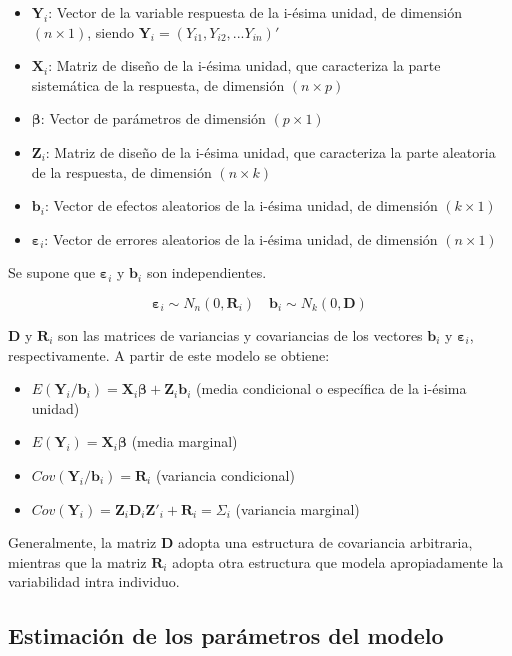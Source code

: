 \documentclass[spanish]{article}
\numberwithin{figure}{subsection}
\numberwithin{equation}{subsection}
\numberwithin{table}{subsection}
\begin{document}
\begin{itemize}
	\item $\bm{Y}_i$: Vector de la variable respuesta de la i-ésima unidad, de
	dimensión $(n \times 1)$, siendo $\bm{Y}_i = (Y_{i1}, Y_{i2}, ... Y_{in})'$
	\item $\bm{X}_i$: Matriz de diseño de la i-ésima unidad, que caracteriza la
	parte sistemática de la respuesta, de dimensión $(n \times p)$
	\item $\bm{\beta}$: Vector de parámetros de dimensión $(p \times 1)$
	\item $\bm{Z}_i$: Matriz de diseño de la i-ésima unidad, que caracteriza la
	parte aleatoria de la respuesta, de dimensión $(n \times k)$
	\item $\bm{b}_i$: Vector de efectos aleatorios de la i-ésima unidad, de
	dimensión $(k \times 1)$
	\item $\bm{\varepsilon}_i$: Vector de errores aleatorios de la i-ésima unidad,
	de dimensión $(n \times 1)$
\end{itemize}

Se supone que $\bm{\varepsilon}_i$ y $\bm{b}_i$ son independientes.

\[ \bm{\varepsilon}_i \sim N_{n}(0, \bm{R}_i) \quad \bm{b}_i \sim N_k(0, \bm{D}) \]

$\bm{D}$ y $\bm{R}_i$ son las matrices de variancias y covariancias de los
vectores $\bm{b}_i$ y $\bm{\varepsilon}_i$, respectivamente. A partir de este
modelo se obtiene:

\begin{itemize}
	\item $E(\bm{Y}_i/\bm{b}_i) = \bm{X}_i\bm{\beta} + \bm{Z}_i\bm{b}_i$ (media condicional o específica de
	la i-ésima unidad)
	\item $E(\bm{Y}_i) = \bm{X}_i\bm{\beta}$ (media marginal)
	\item $Cov(\bm{Y}_i/\bm{b}_i) = \bm{R}_i$ (variancia condicional)
	\item $Cov(\bm{Y}_i) = \bm{Z}_i \bm{D}_i \bm{Z}'_i + \bm{R}_i = \bm{\varSigma}_i$ (variancia marginal)
\end{itemize}

Generalmente, la matriz $\bm{D}$ adopta una estructura de covariancia
arbitraria, mientras que la matriz $\bm{R}_i$ adopta otra estructura que modela
apropiadamente la variabilidad intra individuo.

\subsection{Estimación de los parámetros del modelo}
\end{document}
